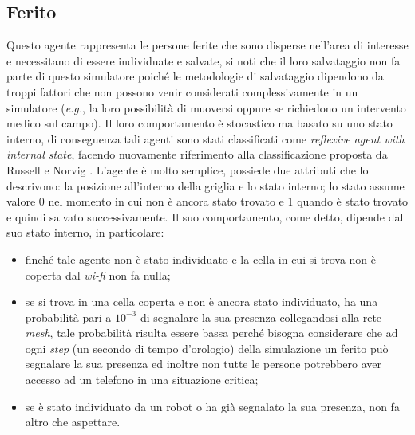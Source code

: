 \subsection{Ferito}
Questo agente rappresenta le persone ferite che sono disperse nell'area di interesse e necessitano di essere individuate e salvate, si noti che il loro salvataggio non fa parte di questo simulatore poiché le metodologie di salvataggio dipendono da troppi fattori che non possono venir considerati complessivamente in un simulatore (\textit{e.g.}, la loro possibilità di muoversi oppure se richiedono un intervento medico sul campo).
Il loro comportamento è stocastico ma basato su uno stato interno, di conseguenza tali agenti sono stati classificati come \textit{reflexive agent with internal state}, facendo nuovamente riferimento alla classificazione proposta da Russell e Norvig \cite{russell2016}.
L'agente è molto semplice, possiede due attributi che lo descrivono: la posizione all'interno della griglia e lo stato interno; lo stato assume valore 0 nel momento in cui non è ancora stato trovato e 1 quando è stato trovato e quindi salvato successivamente.
Il suo comportamento, come detto, dipende dal suo stato interno, in particolare: 
\begin{itemize}
	\item finché tale agente non è stato individuato e la cella in cui si trova non è coperta dal \textit{wi-fi} non fa nulla;
	\item se si trova in una cella coperta e non è ancora stato individuato, ha una probabilità pari a $10^{-3}$ di segnalare la sua presenza collegandosi alla rete \textit{mesh}, tale probabilità risulta essere bassa perché bisogna considerare che ad ogni \textit{step} (un secondo di tempo d'orologio) della simulazione un ferito può segnalare la sua presenza ed inoltre non tutte le persone potrebbero aver accesso ad un telefono in una situazione critica;
	\item se è stato individuato da un robot o ha già segnalato la sua presenza, non fa altro che aspettare.
\end{itemize}
